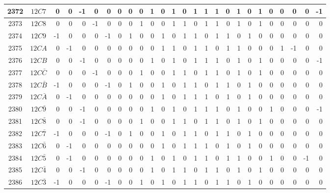 \documentclass[12 pt]{article}%
\begin{document}
\begin{tiny}
\begin{centering}
\begin{longtable}{|c|c||rrrrrrrrrrrrrrrrrrrrrrrr|}
      \hline
      2372 & $12C7$ & 0 & 0 & -1 & 0 & 0 & 0 & 0 & 0 & 1 & 0 & 1 & 0 & 1 & 1 & 1 & 0 & 1 & 0 & 1 & 0 & 0 & 0 & 0 & -1 \\
      \hline
      2373 & $12C8$ & 0 & 0 & 0 & -1 & 0 & 0 & 0 & 1 & 0 & 0 & 1 & 1 & 0 & 1 & 1 & 0 & 1 & 0 & 1 & 0 & 0 & 0 & 0 & 0 \\
      \hline
      2374 & $12C9$ & -1 & 0 & 0 & 0 & -1 & 0 & 1 & 0 & 0 & 1 & 0 & 1 & 1 & 0 & 1 & 1 & 0 & 1 & 0 & 0 & 0 & 0 & 0 & 0 \\
      \hline
      2375 & $12CA$ & 0 & -1 & 0 & 0 & 0 & 0 & 0 & 0 & 0 & 1 & 1 & 0 & 1 & 1 & 0 & 1 & 1 & 0 & 0 & 0 & 1 & -1 & 0 & 0 \\
      \hline
      2376 & $12CB$ & 0 & 0 & -1 & 0 & 0 & 0 & 0 & 0 & 1 & 0 & 1 & 0 & 1 & 1 & 1 & 0 & 1 & 0 & 1 & 0 & 0 & 0 & 0 & -1 \\
      \hline
      2377 & $12C\bar C$ & 0 & 0 & 0 & -1 & 0 & 0 & 0 & 1 & 0 & 0 & 1 & 1 & 0 & 1 & 1 & 0 & 1 & 0 & 1 & 0 & 0 & 0 & 0 & 0 \\
      \hline
      2378 & $12C\bar B$ & -1 & 0 & 0 & 0 & -1 & 0 & 1 & 0 & 0 & 1 & 0 & 1 & 1 & 0 & 1 & 1 & 0 & 1 & 0 & 0 & 0 & 0 & 0 & 0 \\
      \hline
      2379 & $12C\bar A$ & 0 & -1 & 0 & 0 & 0 & 0 & 0 & 0 & 0 & 1 & 0 & 1 & 1 & 1 & 0 & 1 & 0 & 1 & 0 & 0 & 0 & 0 & 0 & 0 \\
      \hline
      2380 & $12C\bar9$ & 0 & 0 & -1 & 0 & 0 & 0 & 0 & 0 & 1 & 0 & 1 & 0 & 1 & 1 & 1 & 0 & 1 & 0 & 0 & 1 & 0 & 0 & 0 & -1 \\
      \hline
      2381 & $12C\bar8$ & 0 & 0 & -1 & 0 & 0 & 0 & 0 & 1 & 0 & 0 & 1 & 1 & 0 & 1 & 1 & 0 & 1 & 0 & 1 & 0 & 0 & 0 & 0 & 0 \\
      \hline
      2382 & $12C\bar7$ & -1 & 0 & 0 & 0 & -1 & 0 & 1 & 0 & 0 & 1 & 0 & 1 & 1 & 0 & 1 & 1 & 0 & 1 & 0 & 0 & 0 & 0 & 0 & 0 \\
      \hline
      2383 & $12C\bar6$ & 0 & -1 & 0 & 0 & 0 & 0 & 0 & 0 & 0 & 1 & 0 & 1 & 1 & 1 & 0 & 1 & 0 & 1 & 0 & 0 & 0 & 0 & 0 & 0 \\
      \hline
      2384 & $12C\bar5$ & 0 & -1 & 0 & 0 & 0 & 0 & 0 & 0 & 1 & 0 & 1 & 0 & 1 & 1 & 0 & 1 & 1 & 0 & 0 & 1 & 0 & 0 & -1 & 0 \\
      \hline
      2385 & $12C\bar4$ & 0 & 0 & -1 & 0 & 0 & 0 & 0 & 0 & 1 & 0 & 1 & 1 & 0 & 1 & 1 & 0 & 1 & 0 & 1 & 0 & 0 & 0 & 0 & 0 \\
      \hline
      2386 & $12C\bar3$ & -1 & 0 & 0 & 0 & -1 & 0 & 0 & 1 & 0 & 1 & 0 & 1 & 1 & 0 & 1 & 1 & 0 & 1 & 0 & 0 & 0 & 0 & 0 & 0 \\

\end{longtable}
\end{centering}
\end{tiny}
\end{document}
